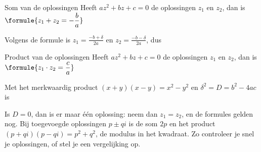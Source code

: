 \begin{theorie}
\begin{stelling}{Som van de oplossingen}
Heeft $az^2 + bz + c = 0$ de oplossingen $z_1$ en $z_2$, dan is \quad $\formule{z_1 + z_2 = -\dfrac{b}{a}}$
\end{stelling}

\begin{bewijs}
Volgens de formule is $z_1 = \frac{-b + \delta}{2a}$ en $z_2 = \frac{-b - \delta}{2a}$, dus
\end{bewijs}

\begin{stelling}{Product van de oplossingen}
Heeft $az^2 + bz + c = 0$ de oplossingen $z_1$ en $z_2$, dan is \quad $\formule{z_1 \cdot z_2 = \dfrac{c}{a}}$
\end{stelling}

\begin{bewijs}
Met het merkwaardig product $(x + y)(x - y) = x^2 - y^2$ en $\delta^2 = D = b^2 - 4ac$ is
\end{bewijs}
\end{theorie}

Is $D = 0$, dan is er maar één oplossing: neem dan $z_1 = z_2$, en de formules gelden nog. Bij toegevoegde oplossingen $p \pm qi$ is de som $2p$ en het product $(p + qi)(p - qi) = p^2 + q^2$, de modulus in het kwadraat. Zo controleer je snel je oplossingen, of stel je een vergelijking op.


